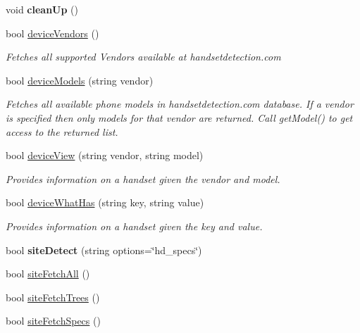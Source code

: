 \begin{DoxyCompactItemize}
\item 
\hypertarget{class_h_d3_1_1_h_d3_a0431d69035a8245a195f9060d5525790}{void {\bfseries clean\+Up} ()}\label{class_h_d3_1_1_h_d3_a0431d69035a8245a195f9060d5525790}

\item 
bool \hyperlink{class_h_d3_1_1_h_d3_aa2f63450321e2f47b2cb3baf8ff1a5e8}{device\+Vendors} ()
\begin{DoxyCompactList}\small\item\em Fetches all supported Vendors available at handsetdetection.\+com\end{DoxyCompactList}\item 
bool \hyperlink{class_h_d3_1_1_h_d3_a5af669048eb1d372a703dd53b242fe2f}{device\+Models} (string vendor)
\begin{DoxyCompactList}\small\item\em Fetches all available phone models in handsetdetection.\+com database. If a vendor is specified then only models for that vendor are returned. Call get\+Model() to get access to the returned list. \end{DoxyCompactList}\item 
bool \hyperlink{class_h_d3_1_1_h_d3_aaba6d717a4579ca6fa7c5727e5d92333}{device\+View} (string vendor, string model)
\begin{DoxyCompactList}\small\item\em Provides information on a handset given the vendor and model. \end{DoxyCompactList}\item 
bool \hyperlink{class_h_d3_1_1_h_d3_a9640edbaf4dd41cd1c8bec9fa86f53a6}{device\+What\+Has} (string key, string value)
\begin{DoxyCompactList}\small\item\em Provides information on a handset given the key and value. \end{DoxyCompactList}\item 
\hypertarget{class_h_d3_1_1_h_d3_a094f2de65aed6b70560ae08c8fabfb2b}{bool {\bfseries site\+Detect} (string options=\char`\"{}hd\+\_\+specs\char`\"{})}\label{class_h_d3_1_1_h_d3_a094f2de65aed6b70560ae08c8fabfb2b}

\item 
bool \hyperlink{class_h_d3_1_1_h_d3_ad40ca41ce8ab43e23d9fec5d69eb59b5}{site\+Fetch\+All} ()
\item 
bool \hyperlink{class_h_d3_1_1_h_d3_ab7987ac1e6295533e55dcd5d300ae9cc}{site\+Fetch\+Trees} ()
\item 
bool \hyperlink{class_h_d3_1_1_h_d3_ae8d86be9f088829ebe42214cfb26672e}{site\+Fetch\+Specs} ()
\end{DoxyCompactItemize}
